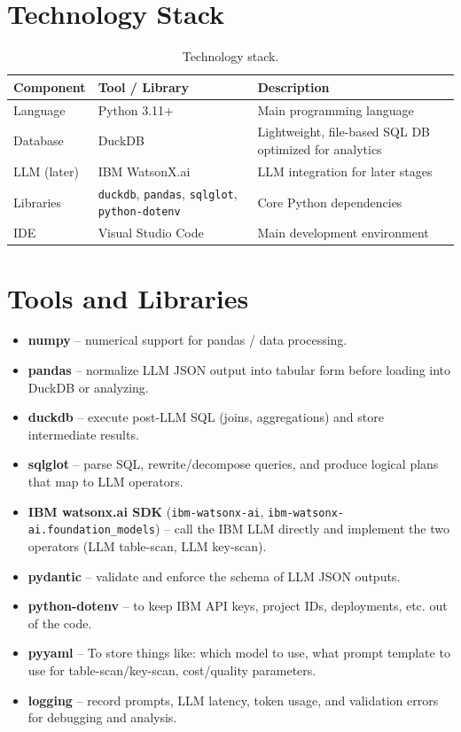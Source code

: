 \documentclass[11pt,a4paper]{article}
\begin{document}
\section{Technology Stack}

\begin{table}[h]
  \centering
  \begin{tabular}{@{}llp{7cm}@{}}
    \toprule
    \textbf{Component} & \textbf{Tool / Library} & \textbf{Description} \\
    \midrule
    Language & Python 3.11+ & Main programming language \\
    Database & DuckDB & Lightweight, file-based SQL DB optimized for analytics \\
    LLM (later) & IBM WatsonX.ai & LLM integration for later stages \\
    Libraries & \texttt{duckdb}, \texttt{pandas}, \texttt{sqlglot}, \texttt{python-dotenv} & Core Python dependencies \\
    IDE & Visual Studio Code & Main development environment \\
    \bottomrule
  \end{tabular}
  \caption{Technology stack.}
\end{table}


\section{Tools and Libraries}
\begin{itemize}
  \item \textbf{numpy} -- numerical support for pandas / data processing.
  \item \textbf{pandas} -- normalize LLM JSON output into tabular form before loading into DuckDB or analyzing.
  \item \textbf{duckdb} -- execute post-LLM SQL (joins, aggregations) and store intermediate results.
  \item \textbf{sqlglot} -- parse SQL, rewrite/decompose queries, and produce logical plans that map to LLM operators.
  \item \textbf{IBM watsonx.ai SDK} (\texttt{ibm-watsonx-ai}, \texttt{ibm-watsonx-ai.foundation\_models}) -- call the IBM LLM directly and implement the two operators (LLM table-scan, LLM key-scan).
  \item \textbf{pydantic} -- validate and enforce the schema of LLM JSON outputs.
  \item \textbf{python-dotenv} -- to keep IBM API keys, project IDs, deployments, etc. out of the code.
  \item \textbf{pyyaml} -- To store things like: which model to use, what prompt template to use for table-scan/key-scan, cost/quality parameters.
  \item \textbf{logging} -- record prompts, LLM latency, token usage, and validation errors for debugging and analysis.
\end{itemize}
\end{document}

